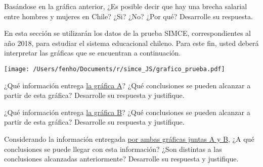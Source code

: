\documentclass{caes}
\begin{document}
\newpage 
\pregunta Basándose en la gráfica anterior, ¿Es posible decir que hay una brecha salarial
entre hombres y \mbox{mujeres} en Chile? ¿Si? ¿No? ¿Por qué? Desarrolle su respuesta.   
\respuesta[10]

\parte En esta sección se utilizarán los datos de la prueba SIMCE, correspondientes al 
año 2018, para estudiar el sistema educacional chileno. Para este fin, usted deberá 
interpretar las gráficas que se encuentran a continuación.

\begin{center}
    \texttt{[image: /Users/fenho/Documents/r/simce\_JS/grafico\_prueba.pdf]}    
\end{center}

\newpage
\pregunta ¿Qué información entrega \underline{la gráfica A}? ¿Qué conclusiones se pueden alcanzar 
a partir de esta gráfica? Desarrolle su respuesta y justifique. 
\respuesta[8]

\pregunta ¿Qué información entrega \underline{la gráfica B}? ¿Qué conclusiones se pueden alcanzar 
a partir de esta gráfica? Desarrolle su respuesta y justifique.
\respuesta[8]

\pregunta Considerando la información entregada \underline{por ambas gráficas juntas A y B}, 
¿A qué conclusiones se puede llegar con esta información? ¿Son distintas a las conclusiones 
alcanzadas anteriormente? Desarrolle su respuesta y justifique.
\respuesta[10]
\end{document}
